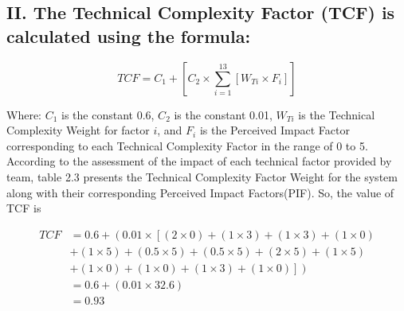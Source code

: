 \documentclass[english,12pt,a4paper]{report}
\begin{document}
	\subsection*{II. The Technical Complexity Factor (TCF) is calculated using the formula:}
	
	\begin{equation}
		TCF = C_{1} + \left[C_{2} \times \sum_{i=1}^{13} \left[W_{Ti} \times F_i\right]\right]
	\end{equation}
	
	Where:
	\( C_{1} \) is the constant 0.6,
	\( C_{2} \) is the constant 0.01,
	\( W_{Ti} \) is the Technical Complexity Weight for factor \( i \), and
	\( F_i \) is the Perceived Impact Factor corresponding to each Technical Complexity Factor in the range of 0 to 5.\\
	According to the assessment of the impact of each technical factor provided by team, table 2.3 presents the Technical Complexity Factor Weight for the system along with their corresponding Perceived Impact Factors(PIF). So, the value of TCF is
	
	\begin{equation}
		\begin{aligned}
			TCF &= 0.6 + \left(0.01 \times \left[(2 \times 0) + (1 \times 3) + (1 \times 3) + (1 \times 0) \right.\right. \\
			&\left.\left. + (1 \times 5) + (0.5 \times 5) + (0.5 \times 5) + (2 \times 5) + (1 \times 5) \right.\right. \\
			&\left.\left. + (1 \times 0) + (1 \times 0) + (1 \times 3) + (1 \times 0)\right]\right) \\
			&= 0.6 + \left(0.01 \times 32.6\right) \\
			&= 0.93
		\end{aligned}
	\end{equation}
	
\end{document}
